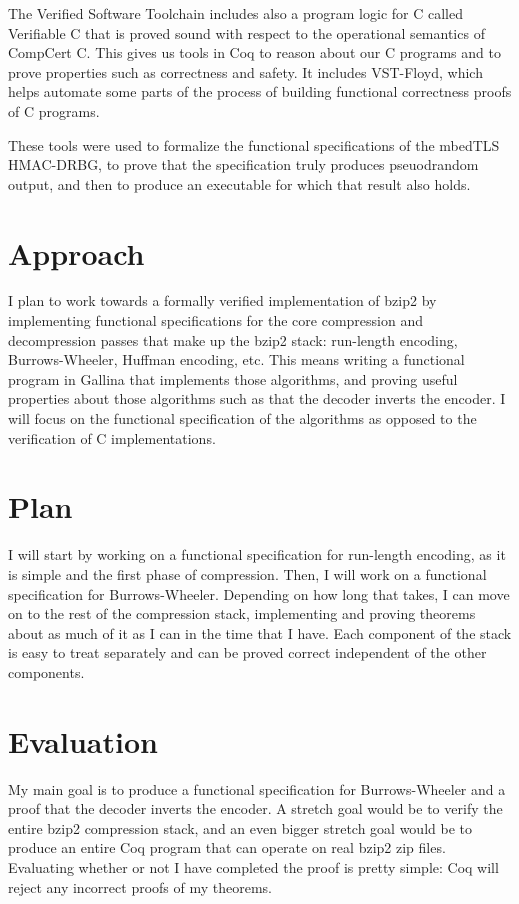 \documentclass{article}
\begin{document}
The Verified Software
Toolchain\cite{Appel:2011:VST:1987211.1987212,Appel:2014:PLC:2670099}
includes also a program logic for C called Verifiable C that is proved
sound with respect to the operational semantics of CompCert C. This
gives us tools in Coq to reason about our C programs and to prove
properties such as correctness and safety. It includes
VST-Floyd\cite{cao2018vst-floyd:}, which helps automate some parts of
the process of building functional correctness proofs of C programs.

These tools were used to formalize the functional specifications of
the mbedTLS HMAC-DRBG, to prove that the specification truly produces
pseuodrandom output, and then to produce an executable for which that
result also holds\cite{Ye:2017:VCS:3133956.3133974}.

\section{Approach}
I plan to work towards a formally verified implementation of bzip2 by
implementing functional specifications for the core compression and
decompression passes that make up the bzip2 stack: run-length
encoding, Burrows-Wheeler, Huffman encoding, etc. This means writing a
functional program in Gallina that implements those algorithms, and
proving useful properties about those algorithms such as that the
decoder inverts the encoder. I will focus on the functional
specification of the algorithms as opposed to the verification of C
implementations.

\section{Plan}
I will start by working on a functional specification for run-length
encoding, as it is simple and the first phase of compression. Then, I
will work on a functional specification for Burrows-Wheeler. Depending
on how long that takes, I can move on to the rest of the compression
stack, implementing and proving theorems about as much of it as I can
in the time that I have. Each component of the stack is easy to treat
separately and can be proved correct independent of the other
components.

\section{Evaluation}
My main goal is to produce a functional specification for
Burrows-Wheeler and a proof that the decoder inverts the encoder. A
stretch goal would be to verify the entire bzip2 compression stack,
and an even bigger stretch goal would be to produce an entire Coq
program that can operate on real bzip2 zip files. Evaluating whether
or not I have completed the proof is pretty simple: Coq will reject
any incorrect proofs of my theorems.

\printbibliography{}
\end{document}
